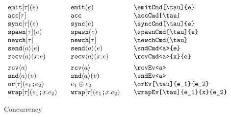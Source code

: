 \documentclass[11pt]{article}
\begin{document}
\begin{figure}
  \begin{small}
    \begin{displaymath}
      \begin{array}{l@{\qquad}l@{\qquad}l@{\qquad}l}
        \emitCmd[\tau]{e}     & \emitCmd*{e}        & \verb|\emitCmd[\tau]{e}| \\
        \accCmd[\tau]         & \accCmd*{}          & \verb|\accCmd[\tau]| \\
        \syncCmd[\tau]{e}     & \syncCmd*{e}        & \verb|\syncCmd[\tau]{e}| \\
        \spawnCmd[\tau]{e}    & \spawnCmd*{e}       & \verb|\spawnCmd[\tau]{e}| \\
        \newchCmd{\tau}       & \newchCmd*{\tau}    & \verb|\newchCmd{\tau}| \\
        \sndCmd<a>{e}         & \sndCmd*<a>{e}      & \verb|\sndCmd<a>{e}| \\
        \rcvCmd<a>{x}{e}      & \rcvCmd*<a>{x}{e}   & \verb|\rcvCmd<a>{x}{e}| \\[1ex]
        \rcvEv<a>             & \rcvEv*<a>          & \verb|\rcvEv<a>| \\
        \sndEv<a>{v}          & \sndEv*<a>{v}       & \verb|\sndEv<a>| \\
        \orEv[\tau]{e_1}{e_2}       & \orEv*{e_1}{e_2}    & \verb|\orEv[\tau]{e_1}{e_2}| \\
        \wrapEv[\tau]{e_1}{x}{e_2}  & \wrapEv*{e_1}{x}{e_2} & \verb|\wrapEv[\tau]{e_1}{x}{e_2}|
      \end{array}
    \end{displaymath}
  \end{small}
  \caption{Concurrency}
  \label{fig:conc}
\end{figure}
\end{document}
